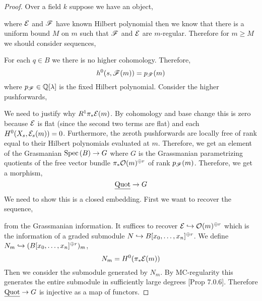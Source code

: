 \documentclass[12pt]{article}
\begin{document}
\begin{proof}
Over a field $k$ suppose we have an object,
\begin{center}
\end{center}
where $\mathcal{E}$ and $\mathscr{F}$ have known Hilbert polynomial then we know that there is a uniform bound $M$ on $m$ such that $\mathscr{F}$ and $\mathcal{E}$ are $m$-regular. Therefore for $m \ge M$ we should consider sequences,
\begin{center}
\end{center}
For each $q \in B$ we there is no higher cohomology. Therefore,  
\[ h^0(s, \mathscr{F}(m)) = p_{\mathscr{F}}(m) \]
where $p_{\mathscr{F}} \in \mathbb{Q}[\lambda]$ is the fixed Hilbert polynomial. Consider the higher pushforwards,
\begin{center}
\end{center}
We need to justify why $R^1 \pi_* \mathcal{E}(m)$. By cohomology and base change this is zero because $\mathcal{E}$ is flat (since the second two terms are flat) and each $H^0(X_s, \mathcal{E}_s(m)) = 0$. Furthermore, the zeroth pushforwards are locally free of rank equal to their Hilbert polynomials evaluated at $m$. Therefore, we get an element of the Grasmanian $\mathrm{Spec}\left( B \right) \to G$ where $G$ is the Grassmanian parametrizing quotients of the free vector bundle $\pi_* \mathcal{O}_{}(m)^{\oplus r}$ of rank $p_{\mathscr{F}}(m)$. Therefore, we get a morphism,
\[ \underline{\mathrm{Quot}} \to G \]
We need to show this is a closed embedding. First we want to recover the sequence,
\begin{center}
\end{center} 
from the Grassmanian information. It suffices to recover $\mathcal{E} \hookrightarrow \mathcal{O}_{}(m)^{\oplus r}$ which is the information of a graded submodule $N \hookrightarrow B[x_0, \dots, x_n]^{\oplus r}$. We define $N_m \hookrightarrow (B[x_0, \dots, x_n]^{\oplus r})_m$,
\[ N_m = H^0(\pi_* \mathcal{E}(m)) \]
Then we consider the submodule generated by $N_m$. By MC-regularity this generates the entire submodule in sufficiently large degrees [Prop 7.0.6]. Therefore $\underline{\mathrm{Quot}} \to G$ is injective as a map of functors. 

\end{proof}
\end{document}
